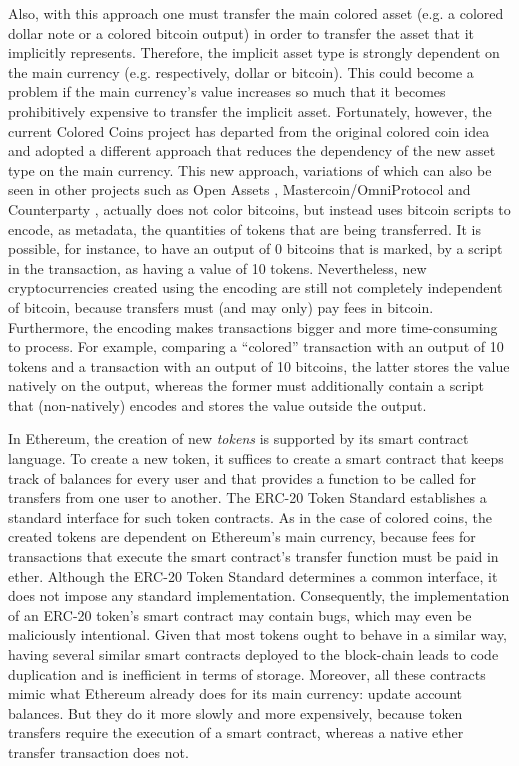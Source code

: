 \documentclass{llncs}
\begin{document}
Also, with this approach one must transfer the main colored asset (e.g. a colored dollar note or a colored bitcoin output) in order to transfer the asset that it implicitly represents. Therefore, the implicit asset type is strongly dependent on the main currency (e.g. respectively, dollar or bitcoin). This could become a problem if the main currency's value increases so much that it becomes prohibitively expensive to transfer the implicit asset. Fortunately, however, the current Colored Coins project \cite{ColoredCoins} has departed from the original colored coin idea and adopted a different approach that reduces the dependency of the new asset type on the main currency. This new approach, variations of which can also be seen in other projects such as Open Assets \cite{OpenAssets}, Mastercoin/OmniProtocol \cite{MasterCoin} and Counterparty \cite{Counterparty}, actually does not color bitcoins, but instead uses bitcoin scripts to encode, as metadata, the quantities of tokens that are being transferred. It is possible, for instance, to have an output of 0 bitcoins that is marked, by a script in the transaction, as having a value of 10 tokens. Nevertheless, new cryptocurrencies created using the encoding are still not completely independent of bitcoin, because transfers must (and may only) pay fees in bitcoin. Furthermore, the encoding makes transactions bigger and more time-consuming to process. For example, comparing a ``colored'' transaction with an output of 10 tokens and a transaction with an output of 10 bitcoins, the latter stores the value natively on the output, whereas the former must additionally contain a script that (non-natively) encodes and stores the value outside the output.

In Ethereum, the creation of new \emph{tokens} is supported by its smart contract language. To create a new token, it suffices to create a smart contract that keeps track of balances for every user and that provides a function to be called for transfers from one user to another. The ERC-20 Token Standard \cite{ERC20} establishes a standard interface for such token contracts. As in the case of colored coins, the created tokens are dependent on Ethereum's main currency, because fees for transactions that execute the smart contract's transfer function must be paid in ether. Although the ERC-20 Token Standard determines a common interface, it does not impose any standard implementation. Consequently, the implementation of an ERC-20 token's smart contract may contain bugs, which may even be maliciously intentional. Given that most tokens ought to behave in a similar way, having several similar smart contracts deployed to the block-chain leads to code duplication and is inefficient in terms of storage. Moreover, all these contracts mimic what Ethereum already does for its main currency: update account balances. But they do it more slowly and more expensively, because token transfers require the execution of a smart contract, whereas a native ether transfer transaction does not.
\end{document}
